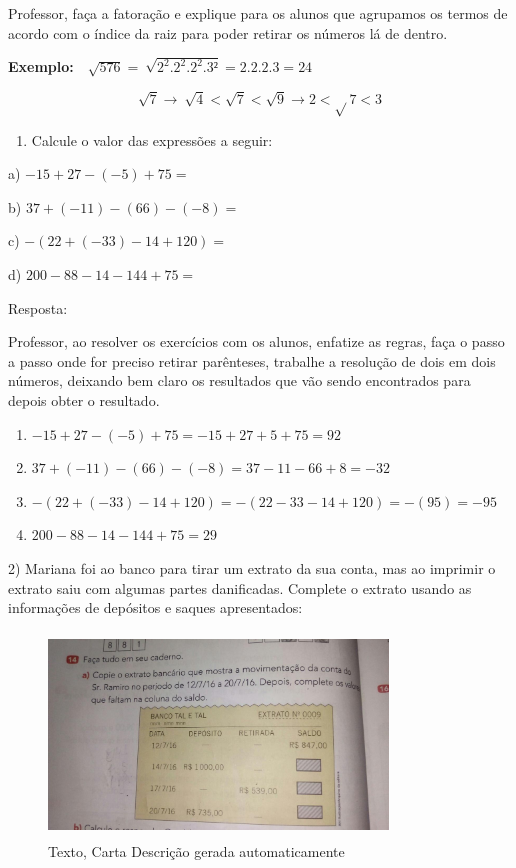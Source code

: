 {{Professor, faça a fatoração e explique para os alunos que agrupamos os
termos de acordo com o índice da raiz para poder retirar os números lá
de dentro.

\textbf{Exemplo:}
\(\text{\ \ \ \ \ \ \ \ \ \ \ \ \ \ \ \ \ \ \ \ \ \ }\sqrt{576} = \ \sqrt{2^{2}.2^{2}.2^{2}.3²} = 2.2.2.3 = 24\)

\[\sqrt{7} \rightarrow \ \sqrt{4} < \sqrt{7} < \sqrt{9} \rightarrow 2 < \sqrt{}7 < 3\]


\begin{enumerate}
\def\labelenumi{\arabic{enumi})}
\tightlist
\item
  Calcule o valor das expressões a seguir:
\end{enumerate}

a) \(- 15 + 27 - \left( - 5 \right) + 75 =\)

b) \(37 + \left( - 11 \right) - \left( 66 \right) - ( - 8) =\)

c) \(- (22 + \left( - 33 \right) - 14 + 120) =\)

d) \(200 - 88 - 14 - 144 + 75 =\)

Resposta:

Professor, ao resolver os exercícios com os alunos, enfatize as regras,
faça o passo a passo onde for preciso retirar parênteses, trabalhe a
resolução de dois em dois números, deixando bem claro os resultados que
vão sendo encontrados para depois obter o resultado.

\begin{enumerate}
\def\labelenumi{\alph{enumi})}
\item
  \(- 15 + 27 - \left( - 5 \right) + 75 = - 15 + 27 + 5 + 75 = 92\)
\item
  \(37 + \left( - 11 \right) - \left( 66 \right) - \left( - 8 \right) = 37 - 11 - 66 + 8 = - 32\)
\item
  \(- \left( 22 + \left( - 33 \right) - 14 + 120 \right) = - \left( 22 - 33 - 14 + 120 \right) = - \left( 95 \right) = - 95\)
\item
  \(200 - 88 - 14 - 144 + 75 = 29\)
\end{enumerate}

2) Mariana foi ao banco para tirar um extrato da sua conta, mas ao
imprimir o extrato saiu com algumas partes danificadas. Complete o
extrato usando as informações de depósitos e saques apresentados:

\begin{figure}
\centering
\includegraphics[width=3.54698in,height=2.14059in]{./imgSAEB_7_MAT/media/image2.jpg}
\caption{Texto, Carta Descrição gerada automaticamente}
\end{figure}

}}

